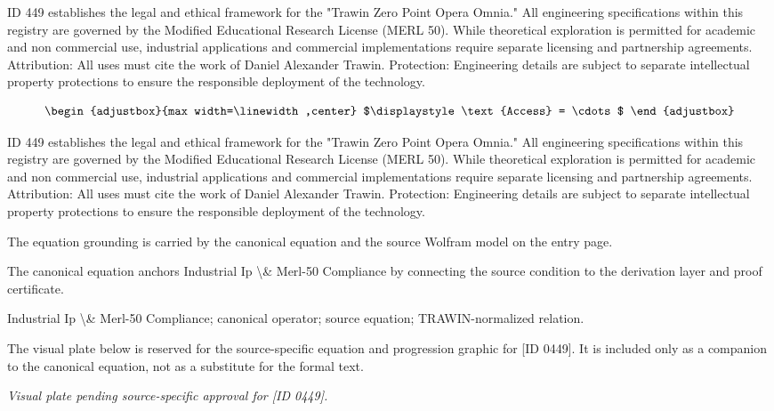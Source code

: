 ID 449 establishes the legal and ethical framework for the "Trawin Zero Point Opera Omnia." All engineering specifications within this registry are governed by the Modified Educational Research License (MERL 50). While theoretical exploration is permitted for academic and non commercial use, industrial applications and commercial implementations require separate licensing and partnership agreements. Attribution: All uses must cite the work of Daniel Alexander Trawin. Protection: Engineering details are subject to separate intellectual property protections to ensure the responsible deployment of the technology.

\[
\begin{adjustbox}{max width=\linewidth,center}
$\displaystyle
\text{Access} = \cdots
$
\end{adjustbox}
\]

ID 449 establishes the legal and ethical framework for the "Trawin Zero Point Opera Omnia." All engineering specifications within this registry are governed by the Modified Educational Research License (MERL 50). While theoretical exploration is permitted for academic and non commercial use, industrial applications and commercial implementations require separate licensing and partnership agreements. Attribution: All uses must cite the work of Daniel Alexander Trawin. Protection: Engineering details are subject to separate intellectual property protections to ensure the responsible deployment of the technology.

The equation grounding is carried by the canonical equation and the source Wolfram model on the entry page.

The canonical equation anchors Industrial Ip \textbackslash{}\& Merl-50 Compliance by connecting the source condition to the derivation layer and proof certificate.

Industrial Ip \textbackslash{}\& Merl-50 Compliance; canonical operator; source equation; TRAWIN-normalized relation.
\endgroup

\begingroup\footnotesize\sloppy
The visual plate below is reserved for the source-specific equation and progression graphic for [ID 0449]. It is included only as a companion to the canonical equation, not as a substitute for the formal text.
\par\endgroup
\begingroup\footnotesize\itshape
Visual plate pending source-specific approval for [ID 0449].
\par\endgroup


